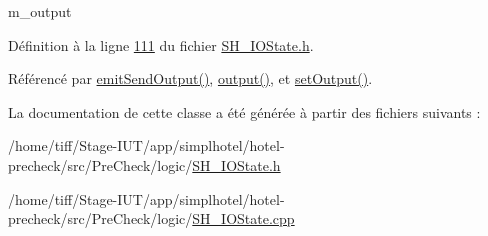 m\-\_\-output 



Définition à la ligne \hyperlink{SH__IOState_8h_source_l00111}{111} du fichier \hyperlink{SH__IOState_8h_source}{S\-H\-\_\-\-I\-O\-State.\-h}.



Référencé par \hyperlink{classSH__InOutState_a40995f4a8201f21d26b7e78b7e7b652e}{emit\-Send\-Output()}, \hyperlink{classSH__InOutState_a17ed7eaf5e3ed5af80a4f9fe65d5bfd9}{output()}, et \hyperlink{classSH__InOutState_af611c84134e262739cd834797b315c80}{set\-Output()}.



La documentation de cette classe a été générée à partir des fichiers suivants \-:\begin{DoxyCompactItemize}
\item 
/home/tiff/\-Stage-\/\-I\-U\-T/app/simplhotel/hotel-\/precheck/src/\-Pre\-Check/logic/\hyperlink{SH__IOState_8h}{S\-H\-\_\-\-I\-O\-State.\-h}\item 
/home/tiff/\-Stage-\/\-I\-U\-T/app/simplhotel/hotel-\/precheck/src/\-Pre\-Check/logic/\hyperlink{SH__IOState_8cpp}{S\-H\-\_\-\-I\-O\-State.\-cpp}\end{DoxyCompactItemize}

